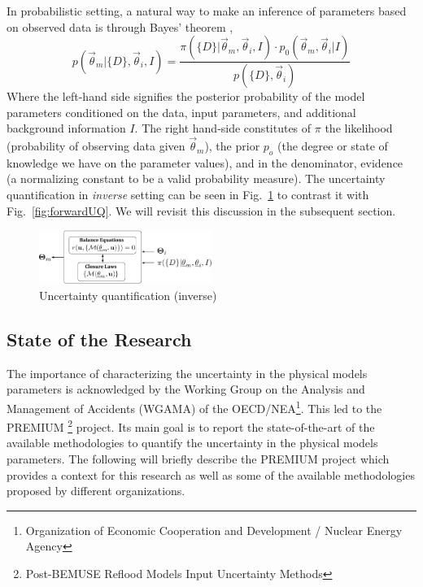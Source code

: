 \documentclass[11pt,titlepage]{article}
\begin{document}
In probabilistic setting, a natural way to make an inference of parameters based on observed data is through Bayes' theorem \cite{Bayes1763},
\begin{equation}
	p(\vec{\theta}_m | \{D\}, \vec{\theta}_i, I) = \frac{\pi(\{D\} | \vec{\theta}_m, \vec{\theta}_i, I) \cdot p_0(\vec{\theta}_m, \vec{\theta}_i | I)}{p(\{D\}, \vec{\theta}_i)}
\nonumber	
\end{equation}
Where the left-hand side signifies the posterior probability of the model parameters conditioned on the data, input parameters, and additional background information $I$. 
The right hand-side constitutes of $\pi$ the likelihood (probability of observing data given $\vec{\theta}_m$), the prior $p_o$ (the degree or state of knowledge we have on the parameter values), and in the denominator, evidence (a normalizing constant to be a valid probability measure).
The uncertainty quantification in \emph{inverse} setting can be seen in Fig.~\ref{fig:backwardUQ} to contrast it with Fig.~\ref{fig:forwardUQ}.
We will revisit this discussion in the subsequent section.
\begin{figure}[htbp]
	\centering
	\includegraphics[width=0.50\textwidth]{backwardUQ.pdf}
	\caption{Uncertainty quantification (inverse)}
	\label{fig:backwardUQ}
\end{figure}

\subsection{State of the Research}

The importance of characterizing the uncertainty in the physical models parameters is acknowledged by the Working Group on the Analysis and Management of Accidents (WGAMA) of the OECD/NEA\footnote{Organization of Economic Cooperation and Development / Nuclear Energy Agency}. 
This led to the PREMIUM \footnote{Post-BEMUSE Reflood Models Input Uncertainty Methods} project.
Its main goal is to report the state-of-the-art of the available methodologies to quantify the uncertainty in the physical models parameters. 
The following will briefly describe the PREMIUM project which provides a context for this research as well as some of the available methodologies proposed by different organizations.
\end{document}

